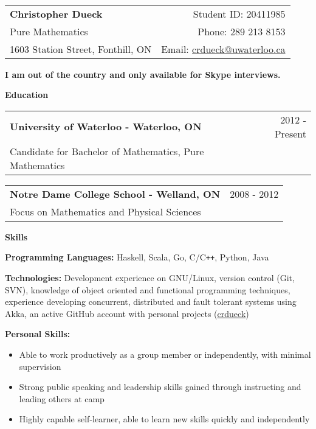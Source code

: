\documentclass[10pt]{article}
\makeatletter
\newcommand{\resheader}[6]{\
\begin{tabular*}{7in}{l@{\extracolsep{\fill}}r}
    \textbf{\huge #1} & {\large #2} \vspace{4pt}\\
    {\large #3} & {\large #4} \vspace{4pt}\\
    {\large #5} & {\large #6}
\end{tabular*}\vspace{4pt}}
\newcommand{\resheading}[1]{{\large \colorbox{headercol}{\begin{minipage}{\textwidth}{\textbf{#1 \vphantom{p\^{E}}}}\end{minipage}}}}
\newcommand{\ressubheading}[3]{\item
\begin{tabular*}{7in}{l@{\extracolsep{\fill}}r}
    \textbf{#1} & #2 \\ #3
\end{tabular*}\vspace{-4pt}}
\newcommand{\resitem}[2]{\item{\textbf{#1} #2}}
\makeatother
\begin{document}
\resheader{Christopher Dueck} {Student ID: 20411985}
{Pure Mathematics} {Phone: 289 213 8153}
{1603 Station Street, Fonthill, ON} {Email: \href{mailto:crdueck@uwaterloo.ca}{crdueck@uwaterloo.ca}}

\resheading{I am out of the country and only available for Skype interviews.}

\resheading{Education}
\begin{description}
    \ressubheading{University of Waterloo - Waterloo, ON} {2012 - Present} {Candidate for Bachelor of Mathematics, Pure Mathematics}
    \ressubheading{Notre Dame College School - Welland, ON} {2008 - 2012} {Focus on Mathematics and Physical Sciences}
\end{description}

\resheading{Skills}
\begin{description}
    \resitem{Programming Languages:} {Haskell, Scala, Go, C/C\texttt{++}, Python, Java}
    \resitem{Technologies:} {Development experience on GNU/Linux, version control (Git, SVN), knowledge of object oriented and functional programming techniques, experience developing concurrent, distributed and fault tolerant systems using Akka, an active GitHub account with personal projects (\href{https://github.com/crdueck}{crdueck})}
    \resitem{Personal Skills:}{\vspace{-4pt}
    \begin{itemize}
        \item{Able to work productively as a group member or independently, with minimal supervision}
        \item{Strong public speaking and leadership skills gained through instructing and leading others at camp}
        \item{Highly capable self-learner, able to learn new skills quickly and independently}
    \end{itemize}}
\end{description}
\end{document}
